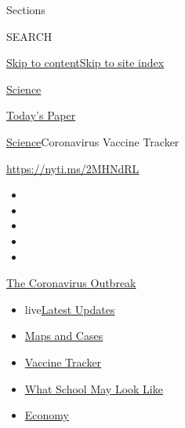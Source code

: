 Sections

SEARCH

\protect\hyperlink{site-content}{Skip to
content}\protect\hyperlink{site-index}{Skip to site index}

\href{https://www.nytimes3xbfgragh.onion/section/science}{Science}

\href{https://myaccount.nytimes3xbfgragh.onion/auth/login?response_type=cookie\&client_id=vi}{}

\href{https://www.nytimes3xbfgragh.onion/section/todayspaper}{Today's
Paper}

\href{/section/science}{Science}\textbar{}Coronavirus Vaccine Tracker

\url{https://nyti.ms/2MHNdRL}

\begin{itemize}
\item
\item
\item
\item
\item
\end{itemize}

\href{https://www.nytimes3xbfgragh.onion/news-event/coronavirus?action=click\&pgtype=Article\&state=default\&region=TOP_BANNER\&context=storylines_menu}{The
Coronavirus Outbreak}

\begin{itemize}
\tightlist
\item
  live\href{https://www.nytimes3xbfgragh.onion/2020/08/02/world/coronavirus-updates.html?action=click\&pgtype=Article\&state=default\&region=TOP_BANNER\&context=storylines_menu}{Latest
  Updates}
\item
  \href{https://www.nytimes3xbfgragh.onion/interactive/2020/us/coronavirus-us-cases.html?action=click\&pgtype=Article\&state=default\&region=TOP_BANNER\&context=storylines_menu}{Maps
  and Cases}
\item
  \href{https://www.nytimes3xbfgragh.onion/interactive/2020/science/coronavirus-vaccine-tracker.html?action=click\&pgtype=Article\&state=default\&region=TOP_BANNER\&context=storylines_menu}{Vaccine
  Tracker}
\item
  \href{https://www.nytimes3xbfgragh.onion/interactive/2020/07/29/us/schools-reopening-coronavirus.html?action=click\&pgtype=Article\&state=default\&region=TOP_BANNER\&context=storylines_menu}{What
  School May Look Like}
\item
  \href{https://www.nytimes3xbfgragh.onion/live/2020/07/31/business/stock-market-today-coronavirus?action=click\&pgtype=Article\&state=default\&region=TOP_BANNER\&context=storylines_menu}{Economy}
\end{itemize}

